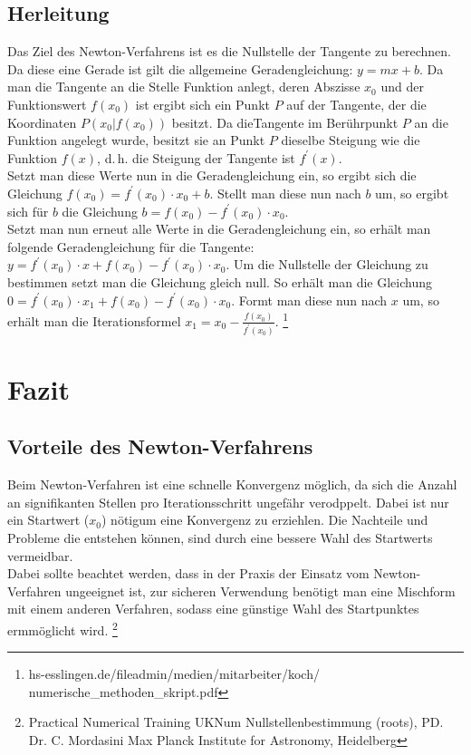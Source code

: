 \documentclass[a4paper,12pt,fleqn,oneside]{article}
\begin{document}
	\subsection{Herleitung}
		Das Ziel des Newton-Verfahrens ist es die Nullstelle der Tangente zu berechnen. Da diese eine Gerade ist gilt die allgemeine Geradengleichung:
		$y = mx + b$. Da man die Tangente an die Stelle Funktion anlegt, deren Abszisse $x_0$ und der Funktionswert $f(x_0)$ ist ergibt sich ein Punkt
		$P$ auf der Tangente, der die Koordinaten $P(x_0|f(x_0))$ besitzt. Da dieTangente im Berührpunkt $P$ an die Funktion angelegt wurde, besitzt
		sie an Punkt $P$ dieselbe Steigung wie die Funktion $f(x)$, d.\,h. die Steigung der Tangente ist $f^\prime(x)$.\\
		Setzt man diese Werte nun in die Geradengleichung ein, so ergibt sich die Gleichung $f(x_0) = f^\prime(x_0) \cdot x_0  + b$. Stellt man diese
		nun nach $b$ um, so ergibt sich für $b$ die Gleichung $b = f(x_0) - f^\prime(x_0) \cdot x_0$.\\
		Setzt man nun erneut alle Werte in die Geradengleichung ein, so erhält man folgende Geradengleichung für die Tangente:
		$y = f^\prime(x_0) \cdot x  + f(x_0) - f^\prime(x_0) \cdot x_0$. Um die Nullstelle der Gleichung zu bestimmen setzt man die Gleichung gleich
		null. So erhält man die Gleichung $0 = f^\prime(x_0) \cdot x_1  + f(x_0) - f^\prime(x_0) \cdot x_0$. Formt man diese nun nach $x$ um, so
		erhält man die Iterationsformel $x_1 =x_0 - \frac{f(x_0)}{f^\prime(x_0)}$.
		\footnote{hs-esslingen.de/fileadmin/medien/mitarbeiter/koch/\\numerische\_methoden\_skript.pdf}
	
\newpage
		
\section{Fazit}
	\subsection{Vorteile des Newton-Verfahrens}
		Beim Newton-Verfahren ist eine schnelle Konvergenz möglich, da sich die Anzahl an signifikanten Stellen pro Iterationsschritt ungefähr verodppelt.
		Dabei ist nur ein Startwert ($x_0$) nötigum eine Konvergenz zu erziehlen. Die Nachteile und Probleme die entstehen können, sind durch eine
		bessere Wahl des Startwerts vermeidbar.\\
		Dabei sollte beachtet werden, dass in der Praxis der Einsatz vom Newton-Verfahren ungeeignet ist, zur sicheren Verwendung benötigt man eine
		Mischform mit einem anderen Verfahren, sodass eine günstige Wahl des Startpunktes ermmöglicht wird.
		\footnote{Practical Numerical Training UKNum Nullstellenbestimmung (roots), PD. Dr. C. Mordasini Max Planck Institute for Astronomy, Heidelberg}
	
\end{document}
